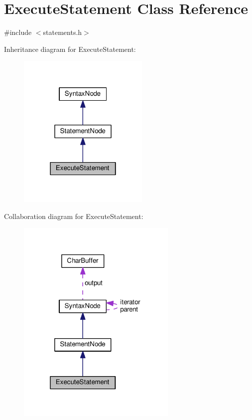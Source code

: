 \hypertarget{classExecuteStatement}{}\section{Execute\+Statement Class Reference}
\label{classExecuteStatement}


{\ttfamily \#include $<$statements.\+h$>$}



Inheritance diagram for Execute\+Statement\+:\nopagebreak
\begin{figure}[H]
\begin{center}
\leavevmode
\includegraphics[width=178pt]{classExecuteStatement__inherit__graph}
\end{center}
\end{figure}


Collaboration diagram for Execute\+Statement\+:\nopagebreak
\begin{figure}[H]
\begin{center}
\leavevmode
\includegraphics[width=217pt]{classExecuteStatement__coll__graph}
\end{center}
\end{figure}
